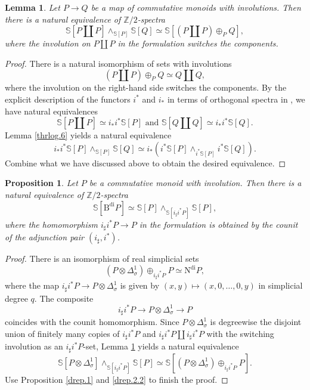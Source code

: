 \documentclass[10pt]{amsart}
\newtheorem{prop}[thm]{Proposition}
\newtheorem{lem}[thm]{Lemma}
\theoremstyle{definition}
\theoremstyle{remark}
\numberwithin{equation}{section}
\newcommand{\Sphere}{\mathbb{S}}
\newcommand{\Bdi}{\mathrm{B}^{\mathrm{di}}}
\newcommand{\Ndi}{\mathrm{N}^\mathrm{di}}
\newcommand{\Ztwo}{{\mathbb{Z}/2}}
\begin{document}
\begin{lem}
\label{drep.6}
Let $P\to Q$ be a map of commutative monoids with involutions.
Then there is a natural equivalence of $\Ztwo$-spectra
\[
\Sphere[P\amalg P]\wedge_{\Sphere[P]}\Sphere[Q]
\simeq
\Sphere[(P\amalg P)\oplus_P Q],
\]
where the involution on $P\amalg P$ in the formulation switches the components.
\end{lem}
\begin{proof}
There is a natural isomorphism of sets with involutions
\[
(P\amalg P) \oplus_P Q
\simeq
Q\amalg Q,
\]
where the involution on the right-hand side switches the components.
By the explicit description of the functors $i^*$ and $i_*$ in terms of orthogonal spectra in \cite[Construction A.2.4]{THR},
we have natural equivalences
\[
\Sphere[P\amalg P]
\simeq
i_*i^*\Sphere[P]
\text{ and }
\Sphere[Q\amalg Q]
\simeq
i_*i^*\Sphere[Q].
\]
Lemma \ref{thrlog.6} yields a natural equivalence
\[
i_*i^*\Sphere[P]
\wedge_{\Sphere[P]}
\Sphere[Q]
\simeq
i_*(i^*\Sphere[P]\wedge_{i^*\Sphere[P]} i^*\Sphere[Q]).
\]
Combine what we have discussed above to obtain the desired equivalence.
\end{proof}


\begin{prop}
\label{drep.2}
Let $P$ be a commutative monoid with involution.
Then there is a natural equivalence of $\Ztwo$-spectra
\[
\Sphere[\Bdi P]
\simeq
\Sphere[P]\wedge_{\Sphere[i_\sharp i^*P]} \Sphere[P],
\]
where the homomorphism $i_\sharp i^*P\to P$ in the formulation is obtained by the counit of the adjunction pair $(i_\sharp,i^*)$.
\end{prop}
\begin{proof}
There is an isomorphism of real simplicial sets
\begin{equation}
\label{drep.2.2}
(P\otimes \Delta_\sigma^1)\oplus_{i_\sharp i^*P} P
\simeq
\Ndi P,
\end{equation}
where the map $i_\sharp i^*P\to P\otimes \Delta_\sigma^1$ is given by $(x,y)\mapsto (x,0,\ldots,0,y)$ in simplicial degree $q$.
The composite
\[
i_\sharp i^*P \to P\otimes \Delta_\sigma^1 \to P
\]
coincides with the counit homomorphism.
Since $P\otimes \Delta_\sigma^1$ is degreewise the disjoint union of finitely many copies of $i_\sharp i^* P$ and $i_\sharp i^*P \amalg i_\sharp i^*P$ with the switching involution as an $i_\sharp i^*P$-set,
Lemma \ref{drep.6} yields a natural equivalence
\[
\Sphere[P\otimes \Delta_\sigma^1]
\wedge_{\Sphere[i_\sharp i^* P]}
\Sphere[P]
\simeq
\Sphere[(P\otimes \Delta_\sigma^1)\oplus_{i_\sharp i^* P} P].
\]
Use Proposition \ref{drep.1} and \eqref{drep.2.2} to finish the proof.
\end{proof}
\end{document}
